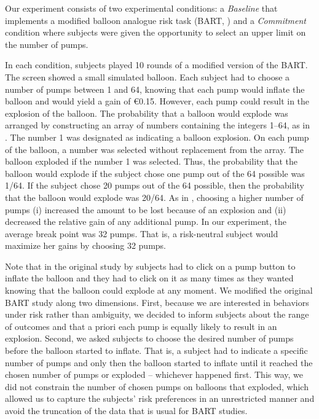 \documentclass[
]{book}
\begin{document}
Our experiment consists of two experimental conditions: a \emph{Baseline} that
implements a modified balloon analogue risk task (BART, \citet{lejuez2002evaluation})
and a \emph{Commitment} condition where subjects were given the opportunity to select
an upper limit on the number of pumps.

In each condition, subjects played 10 rounds of a modified version of the BART.
The screen showed a small simulated balloon.
Each subject had to choose a number of pumps between 1 and 64, knowing that each
pump would inflate the balloon and would yield a gain of €0.15.
However, each pump could result in the explosion of the balloon.
The probability that a balloon would explode was arranged by constructing an
array of numbers containing the integers 1--64, as in \citet{lejuez2002evaluation}.
The number 1 was designated as indicating a balloon explosion.
On each pump of the balloon, a number was selected without replacement from the
array.
The balloon exploded if the number 1 was selected.
Thus, the probability that the balloon would explode if the subject chose one
pump out of the 64 possible was 1/64.
If the subject chose 20 pumps out of the 64 possible, then the probability that
the balloon would explode was 20/64.
As in \citet{lejuez2002evaluation}, choosing a higher number of pumps
(i) increased the amount to be lost because of an explosion and
(ii) decreased the relative gain of any additional pump.
In our experiment, the average break point was 32 pumps.
That is, a risk-neutral subject would maximize her gains by choosing 32 pumps.

Note that in the original study by \citet{lejuez2002evaluation} subjects had to click
on a pump button to inflate the balloon and they had to click on it as many
times as they wanted knowing that the balloon could explode at any moment.
We modified the original BART study along two dimensions.
First, because we are interested in behaviors under risk rather than ambiguity,
we decided to inform subjects about the range of outcomes and that a priori each
pump is equally likely to result in an explosion.
Second, we asked subjects to choose the desired number of pumps before the
balloon started to inflate.
That is, a subject had to indicate a specific number of pumps and only then the
balloon started to inflate until it reached the chosen number of pumps or
exploded -- whichever happened first.
This way, we did not constrain the number of chosen pumps on balloons that
exploded, which allowed us to capture the subjects' risk preferences in an
unrestricted manner and avoid the truncation of the data that is usual for BART
studies.
\end{document}
